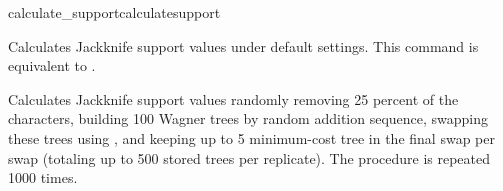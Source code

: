 \begin{command}{calculate\_support}{calculatesupport}
\begin{poyexamples}
            {Calculates Jackknife support values under default settings.  This command
            is equivalent to .}     
            
            {Calculates Jackknife support values randomly removing 25 percent of the
            characters, building 100 Wagner trees by random addition sequence, swapping 
            these trees using , and keeping up to 5 minimum-cost tree in the
            final swap per swap (totaling up to 500 stored trees per replicate). 
            The procedure is repeated 1000 times.}

    \end{poyexamples}
            
    \begin{poyalso}
    \end{poyalso}

\end{command}



   
